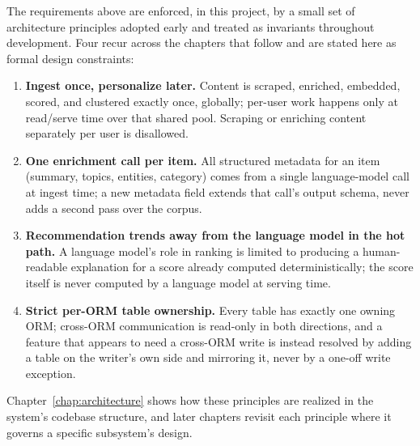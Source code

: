 The requirements above are enforced, in this project, by a small set of
architecture principles adopted early and treated as invariants throughout
development. Four recur across the chapters that follow and are stated here
as formal design constraints:

\begin{enumerate}
  \item \textbf{Ingest once, personalize later.} Content is scraped,
  enriched, embedded, scored, and clustered exactly once, globally; per-user
  work happens only at read/serve time over that shared pool. Scraping or
  enriching content separately per user is disallowed.
  \item \textbf{One enrichment call per item.} All structured metadata for
  an item (summary, topics, entities, category) comes from a single
  language-model call at ingest time; a new metadata field extends that
  call's output schema, never adds a second pass over the corpus.
  \item \textbf{Recommendation trends away from the language model in the
  hot path.} A language model's role in ranking is limited to producing a
  human-readable explanation for a score already computed deterministically;
  the score itself is never computed by a language model at serving time.
  \item \textbf{Strict per-ORM table ownership.} Every table has exactly one
  owning ORM; cross-ORM communication is read-only in both directions, and a
  feature that appears to need a cross-ORM write is instead resolved by
  adding a table on the writer's own side and mirroring it, never by a
  one-off write exception.
\end{enumerate}

Chapter~\ref{chap:architecture} shows how these principles are realized in
the system's codebase structure, and later chapters revisit each principle
where it governs a specific subsystem's design.

